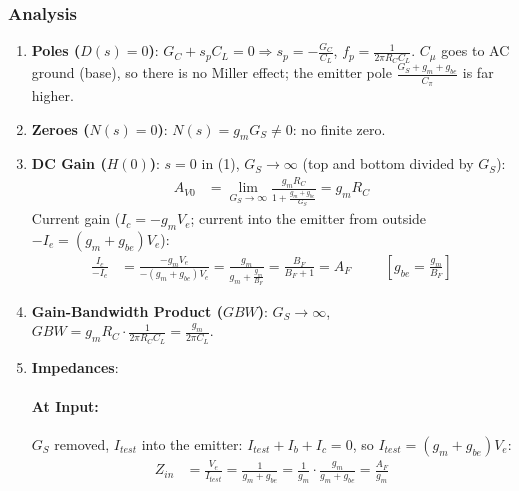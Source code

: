 \subsubsection{Analysis}
\begin{enumerate}
  \item \textbf{Poles (\(D(s) = 0\))}: \(G_C + s_p C_L = 0 \Rightarrow s_p = -\frac{G_C}{C_L}\),
    \(f_p = \frac{1}{2\pi R_C C_L}\). \(C_\mu\) goes to AC ground (base), so there is no Miller
    effect; the emitter pole \(\frac{G_S + g_m + g_{be}}{C_\pi}\) is far higher.
  \item \textbf{Zeroes (\(N(s) = 0\))}: \(N(s) = g_m G_S \neq 0\): no finite zero.
  \item \textbf{DC Gain (\(H(0)\))}: \(s = 0\) in (1), \(G_S \to \infty\) (top and bottom divided by \(G_S\)):
    \begin{align*}
      A_{V0} &= \lim_{G_S \to \infty} \frac{g_m R_C}{1 + \frac{g_m + g_{be}}{G_S}} = g_m R_C
    \end{align*}
    Current gain (\(I_c = -g_m V_e\); current into the emitter from outside \(-I_e = (g_m + g_{be}) V_e\)):
    \begin{align*}
      \frac{I_c}{-I_e} &= \frac{-g_m V_e}{-(g_m + g_{be}) V_e} = \frac{g_m}{g_m + \frac{g_m}{B_F}} = \frac{B_F}{B_F + 1} = A_F \hspace{1cm} [g_{be} = \tfrac{g_m}{B_F}]
    \end{align*}
  \item \textbf{Gain-Bandwidth Product (\(GBW\))}: \(G_S \to \infty\),
    \(GBW = g_m R_C \cdot \frac{1}{2\pi R_C C_L} = \frac{g_m}{2\pi C_L}\).
  \item \textbf{Impedances}:
    \paragraph{At Input:} \(G_S\) removed, \(I_{test}\) into the emitter: \(I_{test} + I_b + I_c = 0\),
    so \(I_{test} = (g_m + g_{be}) V_e\):
    \begin{align*}
      Z_{in} &= \frac{V_e}{I_{test}} = \frac{1}{g_m + g_{be}} = \frac{1}{g_m}\cdot\frac{g_m}{g_m + g_{be}} = \frac{A_F}{g_m}
    \end{align*}

\end{enumerate}
